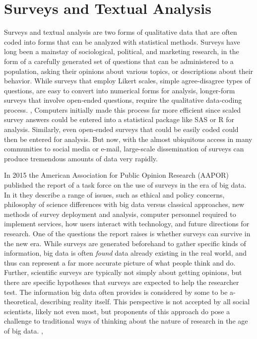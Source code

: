 \documentclass[sigconf]{acmart}
\begin{document}
\section{Surveys and Textual Analysis}
Surveys and textual analysis are two forms of qualitative data that are often coded into forms that can be analyzed with statistical methods.  Surveys have long been a mainstay of sociological, political, and marketing research, in the form of a carefully generated set of questions that can be administered to a population, asking their opinions about various topics, or descriptions about their behavior.  While surveys that employ Likert scales, simple agree-disagree types of questions, are easy to convert into numerical forms for analysis, longer-form surveys that involve open-ended questions, require the qualitative data-coding process. \cite{bryman16}, \cite{lazer17} Computers initially made this process far more efficient since scaled survey answers could be entered into a statistical package like SAS or R for analysis.  Similarly, even open-ended surveys that could be easily coded could then be entered for analysis.  But now, with the almost ubiquitous access in many communities to social media or e-mail, large-scale dissemination of surveys can produce tremendous amounts of data very rapidly. \cite{couper17}

In 2015 the American Association for Public Opinion Research (AAPOR) published the report of a task force on the use of surveys in the era of big data. \cite{japec15}  In it they describe a range of issues, such as ethical and policy concerns, philosophy of science differences with big data versus classical approaches, new methods of survey deployment and analysis, computer personnel required to implement services, how users interact with technology, and future directions for research.  One of the questions the report raises is whether surveys can survive in the new era.  While surveys are generated beforehand to gather specific kinds of information, big data is often {\em found} data already existing in the real world, and thus can represent a far more accurate picture of what people think and do.  Further, scientific surveys are typically not simply about getting opinions, but there are specific hypotheses that surveys are expected to help the researcher test.  The information big data often provides is considered by some to be a-theoretical, describing reality itself.  This perspective is not accepted by all social scientists, likely not even most, but proponents of this approach do pose a challenge to traditional ways of thinking about the nature of research in the age of big data. \cite{japec15}, \cite{couper17}
\end{document}
